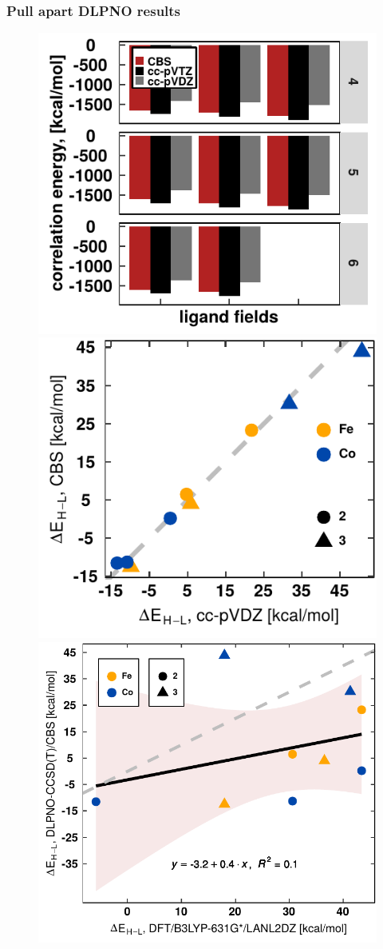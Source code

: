 \documentclass[xcolor=dvipsnames]{beamer}
\begin{document}
\begin{frame}
\frametitle{Pull apart DLPNO results}
\begin{figure}[ht] 
	\label{ fig7} 
	\begin{minipage}[b]{0.5\linewidth}
		\centering
		\includegraphics[width=.6\linewidth]{img/corrVsBasis-CBS-high-spin.pdf} 
	\end{minipage}%
	\begin{minipage}[b]{0.5\linewidth}
		\centering
		\includegraphics[width=.6\linewidth]{img/splitCBSsDZ.pdf} 
	\end{minipage} 
	\begin{minipage}[b]{0.5\linewidth}
		\centering
		\includegraphics[width=.6\linewidth]{img/splitCBSsDFT.pdf} 

\end{minipage}
\end{figure}
\end{frame}
\end{document}
